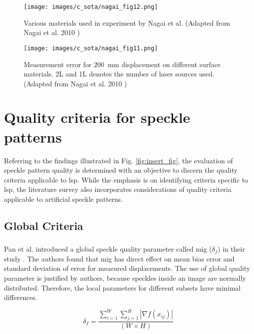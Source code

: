     \begin{figure}[h]
        \centering
        \texttt{[image: images/c\_sota/nagai\_fig12.png]}
        \caption{Various materials used in experiment by Nagai et al. (Adapted from Nagai et al. 2010 \cite{nagai})}
        \label{fig:nagai_fig12}
    \end{figure}

    \begin{figure}[h]
        \centering
        \texttt{[image: images/c\_sota/nagai\_fig11.png]}
        \caption{Measurement error for \SI{200}{\milli\meter} displacement on different surface materials. 2L and 1L denotes the number of laser sources used. (Adapted from Nagai et al. 2010 \cite{nagai})}
        \label{fig:nagai_fig11}
    \end{figure}

    
\section{Quality criteria for speckle patterns}

Referring to the findings illustrated in Fig. \ref{fig:insert_fig}, the evaluation of speckle pattern quality is determined with an objective to discern the quality criteria applicable to \gls{lsp}. While the emphasis is on identifying criteria specific to \gls{lsp}, the literature survey also incorporates considerations of quality criteria applicable to artificial speckle patterns.

    \subsection{Global Criteria}
    
    \subsubsection{}\label{subsubsection:mig}

        Pan et al. introduced a global speckle quality parameter called \gls{mig} ($\delta_f$) in their study \cite{pan_mig}. The authors found that \gls{mig} has direct effect on mean bias error and standard deviation of error for measured displacements. The use of global quality parameter is justified by authors, because speckles inside an image are normally distributed. Therefore, the local parameters for different subsets have minimal differences.

        \begin{equation}
            \delta_f = \dfrac{\displaystyle \sum_{i=1}^{W} \displaystyle \sum_{j=1}^{H} |\nabla f(x_{ij})|}{(W \times H)}
        \end{equation}

